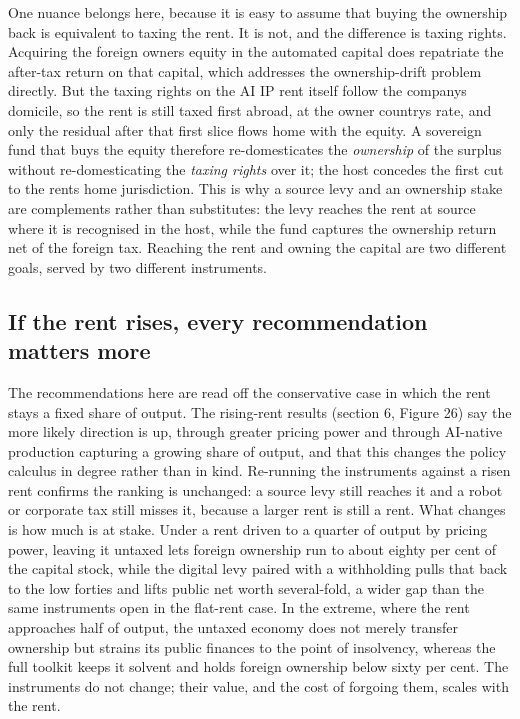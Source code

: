 \documentclass[12pt]{article}
\begin{document}
One nuance belongs here, because it is easy to assume that buying the
ownership back is equivalent to taxing the rent. It is not, and the
difference is taxing rights. Acquiring the foreign owner\textquotesingle s
equity in the automated capital does repatriate the after-tax return on
that capital, which addresses the ownership-drift problem directly. But
the taxing rights on the AI IP rent itself follow the company\textquotesingle s
domicile, so the rent is still taxed first abroad, at the owner
country\textquotesingle s rate, and only the residual after that first
slice flows home with the equity. A sovereign fund that buys the equity
therefore re-domesticates the \emph{ownership} of the surplus without
re-domesticating the \emph{taxing rights} over it; the host concedes the
first cut to the rent\textquotesingle s home jurisdiction. This is why a
source levy and an ownership stake are complements rather than
substitutes: the levy reaches the rent at source where it is recognised
in the host, while the fund captures the ownership return net of the
foreign tax. Reaching the rent and owning the capital are two different
goals, served by two different instruments.

\hypertarget{if-the-rent-rises-every-recommendation-matters-more}{%
\subsection{If the rent rises, every recommendation matters
more}\label{if-the-rent-rises-every-recommendation-matters-more}}

The recommendations here are read off the conservative case in which the
rent stays a fixed share of output. The rising-rent results (section 6,
Figure 26) say the more likely direction is up, through greater pricing
power and through AI-native production capturing a growing share of
output, and that this changes the policy calculus in degree rather than
in kind. Re-running the instruments against a risen rent confirms the
ranking is unchanged: a source levy still reaches it and a robot or
corporate tax still misses it, because a larger rent is still a rent.
What changes is how much is at stake. Under a rent driven to a quarter
of output by pricing power, leaving it untaxed lets foreign ownership
run to about eighty per cent of the capital stock, while the digital
levy paired with a withholding pulls that back to the low forties and
lifts public net worth several-fold, a wider gap than the same
instruments open in the flat-rent case. In the extreme, where the rent
approaches half of output, the untaxed economy does not merely transfer
ownership but strains its public finances to the point of insolvency,
whereas the full toolkit keeps it solvent and holds foreign ownership
below sixty per cent. The instruments do not change; their value, and
the cost of forgoing them, scales with the rent.
\end{document}
